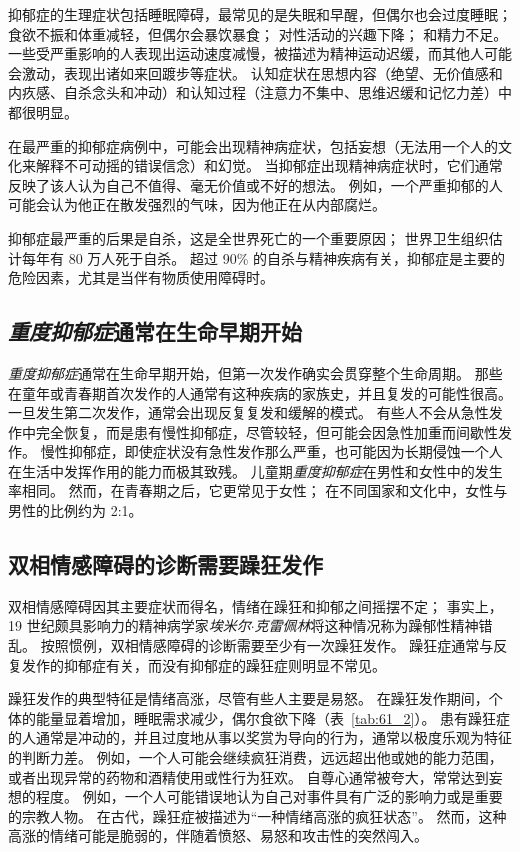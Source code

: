 抑郁症的生理症状包括睡眠障碍，最常见的是失眠和早醒，但偶尔也会过度睡眠；
食欲不振和体重减轻，但偶尔会暴饮暴食；
对性活动的兴趣下降；
和精力不足。
一些受严重影响的人表现出运动速度减慢，被描述为精神运动迟缓，而其他人可能会激动，表现出诸如来回踱步等症状。
认知症状在思想内容（绝望、无价值感和内疚感、自杀念头和冲动）和认知过程（注意力不集中、思维迟缓和记忆力差）中都很明显。


在最严重的抑郁症病例中，可能会出现精神病症状，包括妄想（无法用一个人的文化来解释不可动摇的错误信念）和幻觉。
当抑郁症出现精神病症状时，它们通常反映了该人认为自己不值得、毫无价值或不好的想法。
例如，一个严重抑郁的人可能会认为他正在散发强烈的气味，因为他正在从内部腐烂。


抑郁症最严重的后果是自杀，这是全世界死亡的一个重要原因；
世界卫生组织估计每年有 80 万人死于自杀。
超过 90\% 的自杀与精神疾病有关，抑郁症是主要的危险因素，尤其是当伴有物质使用障碍时。



\subsection{\textit{重度抑郁症}通常在生命早期开始}

\textit{重度抑郁症}通常在生命早期开始，但第一次发作确实会贯穿整个生命周期。
那些在童年或青春期首次发作的人通常有这种疾病的家族史，并且复发的可能性很高。
一旦发生第二次发作，通常会出现反复复发和缓解的模式。
有些人不会从急性发作中完全恢复，而是患有慢性抑郁症，尽管较轻，但可能会因急性加重而间歇性发作。
慢性抑郁症，即使症状没有急性发作那么严重，也可能因为长期侵蚀一个人在生活中发挥作用的能力而极其致残。
儿童期\textit{重度抑郁症}在男性和女性中的发生率相同。
然而，在青春期之后，它更常见于女性；
在不同国家和文化中，女性与男性的比例约为 2:1。



\subsection{双相情感障碍的诊断需要躁狂发作}

双相情感障碍因其主要症状而得名，情绪在躁狂和抑郁之间摇摆不定；
事实上，19 世纪颇具影响力的精神病学家\textit{埃米尔$\cdot$克雷佩林}将这种情况称为躁郁性精神错乱。
按照惯例，双相情感障碍的诊断需要至少有一次躁狂发作。
躁狂症通常与反复发作的抑郁症有关，而没有抑郁症的躁狂症则明显不常见。


躁狂发作的典型特征是情绪高涨，尽管有些人主要是易怒。
在躁狂发作期间，个体的能量显着增加，睡眠需求减少，偶尔食欲下降（表~\ref{tab:61_2}）。
患有躁狂症的人通常是冲动的，并且过度地从事以奖赏为导向的行为，通常以极度乐观为特征的判断力差。
例如，一个人可能会继续疯狂消费，远远超出他或她的能力范围，或者出现异常的药物和酒精使用或性行为狂欢。
自尊心通常被夸大，常常达到妄想的程度。
例如，一个人可能错误地认为自己对事件具有广泛的影响力或是重要的宗教人物。 在古代，躁狂症被描述为“一种情绪高涨的疯狂状态”。
然而，这种高涨的情绪可能是脆弱的，伴随着愤怒、易怒和攻击性的突然闯入。


